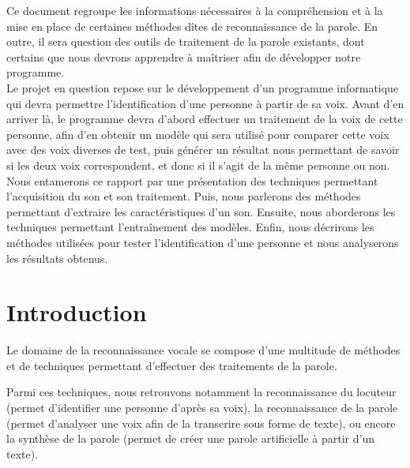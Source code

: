 \documentclass[a4paper, 12pt]{book}
\newcommand{\listofprograms}{\listof{programslist}{Liste des codes source}}
\newcounter{program}[subsection]
\begin{document}
Ce document regroupe les informations nécessaires à la compréhension et à la mise en place de certaines méthodes dîtes de reconnaissance de la parole. En outre, il sera question des outils de traitement de la parole existants, dont certains que nous devrons apprendre à maîtriser afin de développer notre programme.\\

Le projet en question repose sur le développement d'un programme informatique qui devra permettre l'identification d'une personne à partir de sa voix. Avant d'en arriver là, le programme devra d'abord effectuer un traitement de la voix de cette personne, afin d'en obtenir un modèle qui sera utilisé pour comparer cette voix avec des voix diverses de test, puis générer un résultat nous permettant de savoir si les deux voix correspondent, et donc si il s'agit de la même personne ou non.\\

Nous entamerons ce rapport par une présentation des techniques permettant l'acquisition du son et son traitement. Puis, nous parlerons des méthodes permettant d'extraire les caractéristiques d'un son. Ensuite, nous aborderons les techniques permettant l'entraînement des modèles. Enfin, nous décrirons les méthodes utilisées pour tester l'identification d'une personne et nous analyserons les résultats obtenus. 

\tableofcontents
\listoffigures
\listofprograms
\mainmatter
\chapter*{Introduction}

Le domaine de la reconnaissance vocale se compose d'une multitude de méthodes et de techniques permettant d'effectuer des traitements de la parole. 

Parmi ces techniques, nous retrouvons notamment la reconnaissance du locuteur (permet d'identifier une personne d'après sa voix), la reconnaissance de la parole (permet d'analyser une voix afin de la transcrire sous forme de texte), ou encore la synthèse de la parole (permet de créer une parole artificielle à partir d'un texte).
\end{document}
